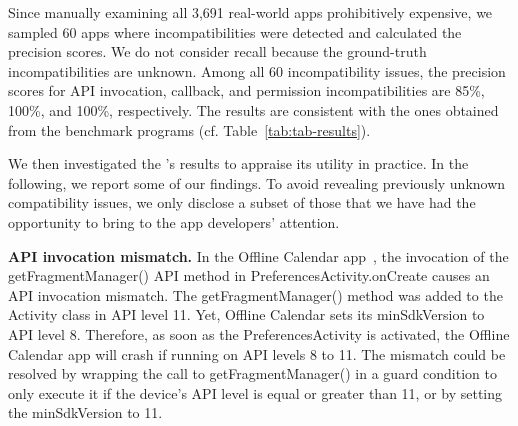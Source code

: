 Since manually examining all 3,691 real-world apps 
prohibitively expensive, we sampled 60 apps where 
incompatibilities were detected and calculated 
the precision scores. We do not consider
recall because the ground-truth incompatibilities
are unknown. Among all 60 incompatibility issues,
the precision scores for API invocation, callback, and permission
incompatibilities are 85\%, 100\%, and 100\%, respectively. 
The results are consistent with the ones obtained from the benchmark programs (cf. Table~\ref{tab:tab-results}). 

 
We then investigated the \@approach's results to
appraise its utility in practice. In the following, we
report some of our findings. To avoid revealing previously
unknown compatibility issues, we only disclose a subset of
those that we have had the opportunity to bring to the app
developers' attention.




\textbf{API invocation mismatch.} In the \textsf{Offline
Calendar} app~\cite{offlinecalendar}, the invocation of the
\textsf{getFragmentManager()} API method in
\textsf{PreferencesActivity.onCreate} causes an API
invocation mismatch.  The \textsf{getFragmentManager()}
method was added to the \textsf{Activity} class in API level
11. Yet, \textsf{Offline Calendar} sets its
\textsf{minSdkVersion} to API level 8. Therefore, as soon as
the \textsf{PreferencesActivity} is activated, the
\textsf{Offline Calendar} app will crash if running on API
levels 8 to 11. The mismatch could be resolved by wrapping
the call to \textsf{getFragmentManager()} in a guard
condition to only execute it if the device's API level is
equal or greater than 11, or by setting the
\textsf{minSdkVersion} to 11.

